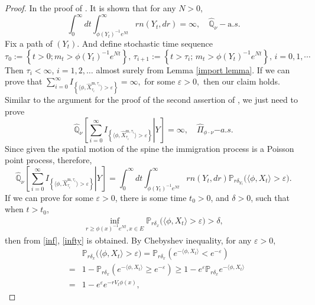 \documentclass[12pt,a4paper]{amsart}
\numberwithin{equation}{section}
\theoremstyle{plain}
\theoremstyle{definition}
\theoremstyle{remark}
\begin{document}
\begin{proof}
	In the proof of \cite[Lemma $3.2$]{LiuRenSong2009Llog}.  It is shown that for any $N>0$,
	\begin{equation}\label{inf}
	\int_0^\infty dt\int_{\phi(Y_t)^{-1}e^{Nt}}^\infty rn(Y_t,dr)
	=\infty,\quad \widehat{\mathbb Q}_\nu-{\mathrm a.s.}
	\end{equation}
	Fix a path of $(Y_t)$.  And define stochastic
	time sequence
	\[
	\tau_0:=\left\{t>0; m_t>\phi(Y_t)^{-1}e^{Nt}\right\},\,
	\tau_{i+1}:=\left\{t>\tau_i;\, m_t>\phi(Y_t)^{-1}e^{Nt}\right\},\, i=0,1,\cdots
	\]
	Then $\tau_i<\infty$, $i=1,2,\ldots$ almost surely from Lemma \ref{import lemma}.
	If we can prove that $\sum_{i=0}^\infty I_{\left\{\langle\phi, \widehat X^{{\mathrm m},\tau_i}_{\tau_i}\rangle  >\varepsilon\right\}}=\infty,$ for some $\varepsilon>0,$ then our claim holds.  Similar to the argument for the proof of the second assertion of \cite[Lemma $2.2$]{LiuRenSong2009Llog}, we just need to prove
	\[
	\widehat{\mathbb Q}_\nu
	\left[\left.\sum_{i=0}^\infty I_{\left\{\langle\phi, \widehat X^{{\mathrm m},\tau_i}_{\tau_i}\rangle  >\varepsilon\right\}} \right| Y\right]=\infty,\quad \widehat\Pi_{\phi\cdot\nu}{\mathrm -a.s.}
	\]
	Since given the spatial motion of the spine the immigration process is a Poisson point process, therefore,
	\[
	\widehat{\mathbb Q}_\nu\left[\left.\sum_{i=0}^\infty I_{\left\{\langle\phi, \widehat X^{{\mathrm m},\tau_i}_{\tau_i}\rangle  >\varepsilon\right\}}\right| Y\right]=\int_0^\infty dt\int_{\phi(Y_t)^{-1}e^{Nt}}^\infty rn(Y_t, dr)\mathbb{P}_{r\delta_{Y_t}}\big(\langle\phi, X_t \rangle >\varepsilon\big).
	\]
	If we can prove for some $\varepsilon>0$, there is some time $t_0>0$, and $\delta>0$, such that when $t>t_0$,
	\begin{eqnarray}\label{last point}
	\inf_{r\geq \phi(x)^{-1}e^{Nt}, x\in E}\mathbb P_{r\delta_x}\big(\langle\phi, X_t
	\rangle >\varepsilon\big)>\delta,
	\end{eqnarray}
	then from \eqref{inf}, \eqref{infty} is obtained.  By Chebyshev inequality, for any $\varepsilon>0$,
	\begin{eqnarray*}
		&&\mathbb P_{r\delta_x}\big(\langle\phi, X_t\rangle >\varepsilon\big)=\mathbb P_{r\delta_x}\left(e^{-\langle\phi, X_t\rangle }<e^{-\varepsilon}\right)\\
		&=&1-\mathbb P_{r\delta_x}\left(e^{-\langle\phi, X_t
			\rangle }\geq e^{-\varepsilon}\right)\geq 1-e^{\varepsilon }\mathbb P_{r\delta_x}e^{-\langle\phi, X_t\rangle }\\
		&=&1-e^{\varepsilon }e^{-rV_t\phi(x)},
	\end{eqnarray*}

\end{proof}
\end{document}

